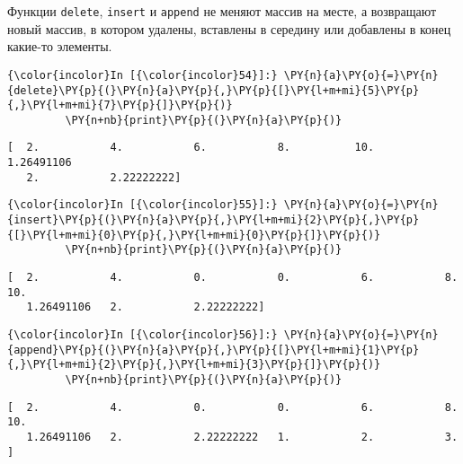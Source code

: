     Функции \texttt{delete}, \texttt{insert} и \texttt{append} не меняют
массив на месте, а возвращают новый массив, в котором удалены, вставлены
в середину или добавлены в конец какие-то элементы.

    \begin{Verbatim}[commandchars=\\\{\}]
{\color{incolor}In [{\color{incolor}54}]:} \PY{n}{a}\PY{o}{=}\PY{n}{delete}\PY{p}{(}\PY{n}{a}\PY{p}{,}\PY{p}{[}\PY{l+m+mi}{5}\PY{p}{,}\PY{l+m+mi}{7}\PY{p}{]}\PY{p}{)}
         \PY{n+nb}{print}\PY{p}{(}\PY{n}{a}\PY{p}{)}
\end{Verbatim}

    \begin{Verbatim}[commandchars=\\\{\}]
[  2.           4.           6.           8.          10.           1.26491106
   2.           2.22222222]

    \end{Verbatim}

    \begin{Verbatim}[commandchars=\\\{\}]
{\color{incolor}In [{\color{incolor}55}]:} \PY{n}{a}\PY{o}{=}\PY{n}{insert}\PY{p}{(}\PY{n}{a}\PY{p}{,}\PY{l+m+mi}{2}\PY{p}{,}\PY{p}{[}\PY{l+m+mi}{0}\PY{p}{,}\PY{l+m+mi}{0}\PY{p}{]}\PY{p}{)}
         \PY{n+nb}{print}\PY{p}{(}\PY{n}{a}\PY{p}{)}
\end{Verbatim}

    \begin{Verbatim}[commandchars=\\\{\}]
[  2.           4.           0.           0.           6.           8.          10.
   1.26491106   2.           2.22222222]

    \end{Verbatim}

    \begin{Verbatim}[commandchars=\\\{\}]
{\color{incolor}In [{\color{incolor}56}]:} \PY{n}{a}\PY{o}{=}\PY{n}{append}\PY{p}{(}\PY{n}{a}\PY{p}{,}\PY{p}{[}\PY{l+m+mi}{1}\PY{p}{,}\PY{l+m+mi}{2}\PY{p}{,}\PY{l+m+mi}{3}\PY{p}{]}\PY{p}{)}
         \PY{n+nb}{print}\PY{p}{(}\PY{n}{a}\PY{p}{)}
\end{Verbatim}

    \begin{Verbatim}[commandchars=\\\{\}]
[  2.           4.           0.           0.           6.           8.          10.
   1.26491106   2.           2.22222222   1.           2.           3.        ]

    \end{Verbatim}

